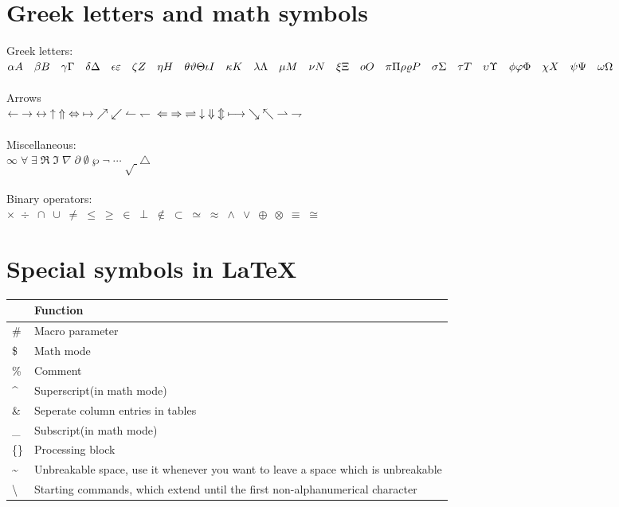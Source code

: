 \documentclass[openany]{book}
\begin{document}
\chapter{Greek letters and math symbols}
Greek letters:\\
$\alpha A \quad
\beta B	 \quad
\gamma \Gamma	\quad
\delta \Delta	\quad
\epsilon \varepsilon \quad
\zeta Z	 \quad
\eta H \quad
\theta \vartheta \Theta \\
%
\iota I	 \quad
\kappa K \quad
\lambda \Lambda \quad
\mu M \quad
\nu N \quad
\xi\Xi \quad
o O \quad
\pi \Pi \\
%
\rho\varrho P \quad
\sigma \Sigma \quad
\tau T \quad
\upsilon \Upsilon \quad
\phi \varphi \Phi \quad
\chi X \quad
\psi \Psi \quad
\omega \Omega$
\\\\
Arrows\\
$
\leftarrow\;
\rightarrow\;
\leftrightarrow\;
\uparrow\;
\Uparrow\;
\Leftrightarrow\;
\mapsto	\;
\nearrow\;
\swarrow\;
\leftharpoonup\;
\leftharpoondown \\
%
\Leftarrow\;
\Rightarrow\;
\rightleftharpoons\;
\downarrow\;
\Downarrow\;
\Updownarrow\;
\longmapsto\;
\searrow\;
\nwarrow\;
\rightharpoonup\;
\rightharpoondown
$
\\\\
Miscellaneous:\\
$
\infty\;
\forall\;
\exists	\;
\Re\;
\Im\;
\nabla\;
\partial\;
\emptyset\;
\wp\;
\neg\;
\cdots\;
\surd\;
\triangle
$
\\\\
Binary operators:\\
$
\times\;
\div\;
\cap\;
\cup\;
\neq\;
\leq\;
\geq\;
\in\;
\perp\;
\notin\;
\subset	\;
\simeq\;
\approx	\;
\wedge\;
\vee\;
\oplus\;
\otimes	\;
\equiv\;
\cong
$


\chapter{Special symbols in LaTeX}
\begin{center}
\begin{tabular}{|m{0.3cm}|m{7cm}|} \hline
     & Function \\\hline
\#   & Macro parameter \\\hline
\$   & Math mode \\\hline
\%   & Comment \\\hline
\^{} & Superscript(in math mode) \\\hline
\&   & Seperate column entries in tables \\\hline
\_   & Subscript(in math mode) \\\hline
\{\} & Processing block \\\hline
\~{} & Unbreakable space, use it whenever you want to leave a space which is unbreakable\\\hline
\textbackslash & Starting commands, which extend until the first non-alphanumerical character\\\hline
\end{tabular}
\end{center}
\end{document}
